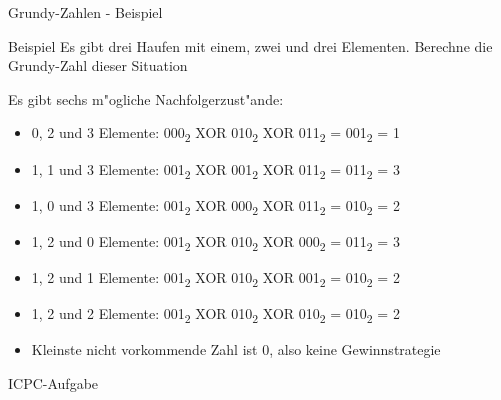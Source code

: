 \documentclass[18pt]{beamer}
\begin{document}
\begin{frame}{Grundy-Zahlen - Beispiel}
\begin{block}{Beispiel}
Es gibt drei Haufen mit einem, zwei und drei Elementen. Berechne die Grundy-Zahl dieser Situation
\end{block}
Es gibt sechs m"ogliche Nachfolgerzust"ande:
\begin{itemize}
\pause
\item 0, 2 und 3 Elemente: 000\textsubscript{2} XOR 010\textsubscript{2} XOR 011\textsubscript{2} = 001\textsubscript{2} = 1
\pause
\item 1, 1 und 3 Elemente: 001\textsubscript{2} XOR 001\textsubscript{2} XOR 011\textsubscript{2} = 011\textsubscript{2} = 3
\pause
\item 1, 0 und 3 Elemente: 001\textsubscript{2} XOR 000\textsubscript{2} XOR 011\textsubscript{2} = 010\textsubscript{2} = 2
\pause
\item 1, 2 und 0 Elemente: 001\textsubscript{2} XOR 010\textsubscript{2} XOR 000\textsubscript{2} = 011\textsubscript{2} = 3
\pause
\item 1, 2 und 1 Elemente: 001\textsubscript{2} XOR 010\textsubscript{2} XOR 001\textsubscript{2} = 010\textsubscript{2} = 2
\pause
\item 1, 2 und 2 Elemente: 001\textsubscript{2} XOR 010\textsubscript{2} XOR 010\textsubscript{2} = 010\textsubscript{2} = 2
\pause
\item Kleinste nicht vorkommende Zahl ist 0, also keine Gewinnstrategie
\end{itemize}
\end{frame}

\begin{frame}{ICPC-Aufgabe}
\end{frame}
\end{document}
